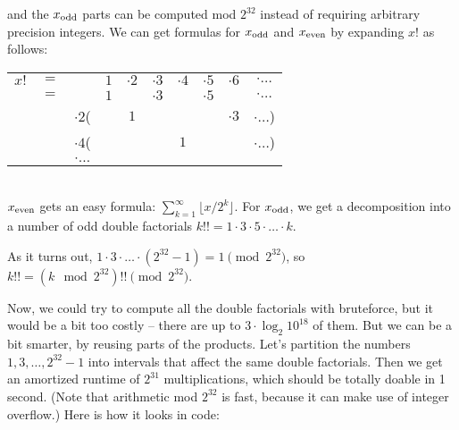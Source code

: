 \documentclass[openany]{book}
\begin{document}
and the $x_\text{odd}$ parts can be computed mod $2^{32}$ instead of requiring arbitrary precision integers.
We can get formulas for $x_\text{odd}$ and $x_\text{even}$ by expanding $x!$ as follows: \\
\begin{tabular}{cccccccccc}
$x!$&$=$&          &$1$& $\cdot 2$ &$\cdot 3$ &$\cdot 4$ &$\cdot 5$ & $\cdot 6$ & $\cdot \ldots$ \\
    &$=$&          &$1$&           &$\cdot 3$ &          &$\cdot 5$ &           & $\cdot \ldots$ \\
    &   &$\cdot 2$(&   & $1$       &          &          &          & $\cdot 3$ & $\cdot \ldots$)\\
    &   &$\cdot 4$(&   &           &          &  $1$     &          &           & $\cdot \ldots$)\\
    &   &$\cdot \ldots$ &
\end{tabular}
\\
$x_\text{even}$ gets an easy formula: $\sum_{k=1}^\infty \lfloor x / 2^k \rfloor$.
For $x_\text{odd}$, we get a decomposition into a number of odd double factorials $k!! = 1 \cdot 3 \cdot 5 \cdot \ldots \cdot k$.

As it turns out, $1 \cdot 3 \cdot \ldots \cdot (2^{32}-1) = 1 \pmod{2^{32}}$, so $k!! = (k \mod 2^{32})!! \pmod{2^{32}}$.

Now, we could try to compute all the double factorials with bruteforce, but it would be a bit too costly -- there are up to $3 \cdot \log_2{10^{18}}$ of them.
But we can be a bit smarter, by reusing parts of the products.
Let's partition the numbers $1, 3, \dots, 2^{32}-1$ into intervals that affect the same double factorials.
Then we get an amortized runtime of $2^{31}$ multiplications, which should be totally doable in 1 second.
(Note that arithmetic mod $2^{32}$ is fast, because it can make use of integer overflow.)
Here is how it looks in code:
\end{document}
